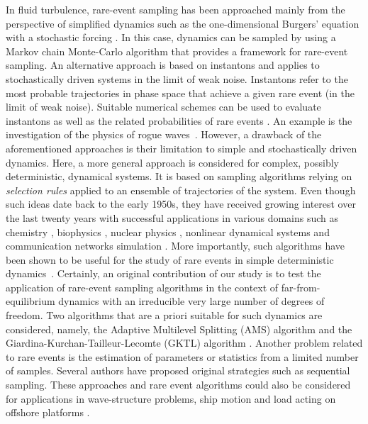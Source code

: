 %
In fluid turbulence, rare-event sampling has been approached mainly from the perspective of simplified dynamics such as the one-dimensional Burgers' equation with a stochastic forcing \citep{bec_burgers_2007}. In this case, dynamics can be sampled by using a Markov chain Monte-Carlo algorithm \citep{duben_monte_2008,mesterhazy2011anomalous,mesterhazy2013lattice} that provides a framework for rare-event sampling.
%
An alternative approach is based on instantons \citep{gurarie_instantons_1996,grafke2015instanton} and applies to stochastically driven systems in the limit of weak noise.
Instantons refer to the most probable trajectories in phase space that achieve a given rare event (in the limit of weak noise). Suitable numerical schemes can be used to evaluate instantons as well as the related probabilities of rare events \citep{chernykh_large_2001,grafke_instanton_2013,grigorio_instantons_2017,laurie2015computation,bouchet2014langevin}.
An example is the investigation of the physics of rogue waves~\citep{dematteis2018rogue,dematteis2019experimental}.
%
However, a drawback of the aforementioned approaches is their limitation to simple and stochastically driven dynamics.
%
%
%
Here, a more general approach is considered for complex, possibly deterministic, dynamical systems.
It is based on sampling algorithms relying on \emph{selection rules} applied to an ensemble of trajectories of the system. 
%
Even though such ideas date back to the early 1950s, they have received growing interest over the last twenty years with successful applications in various domains such as chemistry \citep{van_erp_elaborating_2005,escobedo_transition_2009,teo_adaptive_2016}, biophysics \citep{huber_weighted-ensemble_1996,zuckerman2017weighted,bolhuis2005kinetic}, nuclear physics \citep{louvin2017}, nonlinear dynamical systems \citep{tailleur_probing_2007} and communication networks simulation \citep{villen-altamirano_restart:_1994}.
More importantly, such algorithms have been shown to be useful for the study of rare events in simple deterministic dynamics~\citep{wouters2016rare}.
%
%
Certainly, an original contribution of our study is to test the application of rare-event sampling algorithms in the context of far-from-equilibrium dynamics with an irreducible very large number of degrees of freedom. 
%
Two algorithms that are a priori suitable for such dynamics are considered, namely, the Adaptive Multilevel Splitting (AMS) algorithm \citep{cerou_adaptive_2007} and the Giardina-Kurchan-Tailleur-Lecomte (GKTL) algorithm \citep{giardina_direct_2006}.
%
Another problem related to rare events is the estimation of parameters or statistics from a limited number of samples.  Several authors have proposed original strategies  \citep{Mohamad-ws,Blonigan-ws} such as sequential sampling. These approaches and rare event algorithms could also be considered for applications in wave-structure problems, ship motion and load acting on offshore platforms \citep{belenky-ws}.
